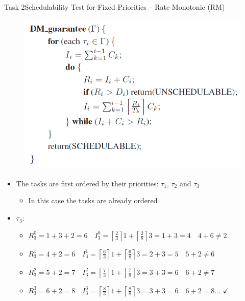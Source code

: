 \begin{frame}[allowframebreaks]{Task 2}{Schedulability Test for Fixed Priorities – Rate Monotonic (RM)}
\begin{requirementsnoinc}
\begin{figure}
      \includegraphics[height=0.5\paperheight]{./figures/2_algorithm.png}
    \end{figure}
  \end{requirementsnoinc}
  \begin{solutionnoinc}
    \begin{itemize}
      \item The tasks are first ordered by their priorities: $\tau_1$, $\tau_2$ and $\tau_3$
      \begin{itemize}
        \item In this case the tasks are already ordered
      \end{itemize}
      \item $\tau_3:$
      \begin{itemize}
        \item $R_3^0=1+3+2=6 \quad I_3^0=\left\lceil\frac{2}{3}\right\rceil 1+\left\lceil\frac{2}{8}\right\rceil 3=1+3=4 \quad 4+6 \neq 2$
        \item $R_3^1=4+2=6 \quad I_3^1=\left\lceil\frac{6}{3}\right\rceil 1+\left\lceil\frac{6}{8}\right\rceil 3=2+3=5 \quad 5+2 \neq 6$
        \item $R_3^2=5+2=7 \quad I_3^2=\left\lceil\frac{7}{3}\right\rceil 1+\left\lceil\frac{7}{8}\right\rceil 3=3+3=6 \quad 6+2 \neq 7$
        \item $R_3^3=6+2=8 \quad I_3^3=\left\lceil\frac{8}{3}\right\rceil 1+\left\lceil\frac{8}{8}\right\rceil 3=3+3=6 \quad 6+2=8 \ldots$ $\checkmark$


\end{itemize}
\end{itemize}
\end{solutionnoinc}
\end{frame}
